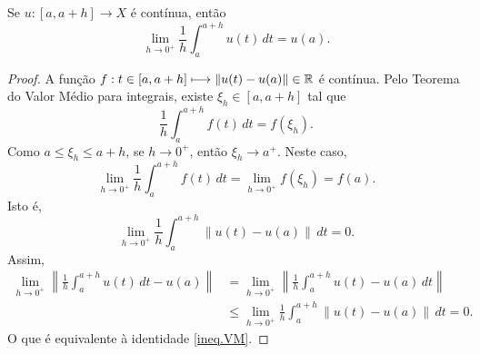 \begin{proposition}
Se $u:[a,a+h]\longrightarrow X$ é {contínua}, então
\begin{equation}\label{ineq.VM}
\lim\limits_{h\to 0^+} \frac{1}{h}\int_a^{a+h} u(t)\,dt = u(a).
\end{equation}
\end{proposition}
\begin{proof}
A função  $f:t\in [a,a+h]\longmapsto \|u(t)-u(a)\|\in \mathbb{R}$ é contínua. Pelo Teorema do Valor Médio para integrais, existe $\xi_h\in [a,a+h]$ tal que 
\[
\frac{1}{h}\int_a^{a+h} f(t)\,dt=f(\xi_h).
\]
Como $a\leq \xi_h\leq a+h$, se $h\to 0^+$, então $\xi_h\to a^+$. Neste caso, 
\[
\lim_{h\to 0^+}\frac{1}{h}\int_a^{a+h} f(t)\,dt=\lim_{h\to 0^+}f(\xi_h)=f(a).
\]
Isto é, 
\begin{equation*}
\lim_{h\to 0^+}\frac{1}{h}\int_a^{a+h} \|u(t)-u(a)\|\,dt=0.
\end{equation*}
Assim, 
\begin{align*}
\lim_{h\to 0^+}\left\|\frac{1}{h}\int_a^{a+h} u(t)\,dt -u(a)\right\|& =
\lim_{h\to 0^+}\left\|\frac{1}{h}\int_a^{a+h} u(t)-u(a)\,dt\right\|\\
&\leq \lim_{h\to 0^+}\frac{1}{h}\int_a^{a+h}\left\| u(t)-u(a)\right\|\,dt
=0.
\end{align*}
O que é equivalente à identidade \eqref{ineq.VM}.
\end{proof}